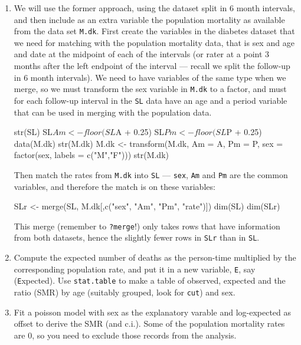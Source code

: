 \begin{enumerate}[resume]
\item We will use the former approach, using the dataset split in
  6 month intervals, and then include as an extra variable the
  population mortality as available from the data set
  \texttt{M.dk}.
  First create the variables in the diabetes dataset that we need
  for matching with the population mortality data, that is sex and
  age and date at the midpoint of each of the intervals (or rater at a
  point 3 months after the left endpoint of the interval --- recall
  we split the follow-up in 6 month intervals).
  We need to have variables of the same type when we merge, so we must
  transform the sex variable in \texttt{M.dk} to a factor, and must
  for each follow-up interval in the \texttt{SL} data have an age and
  a period variable that can be used in merging with the population data.
\begin{Schunk}
\begin{Sinput}
 str(SL)
 SL$Am <- floor(SL$A + 0.25)
 SL$Pm <- floor(SL$P + 0.25)
 data(M.dk)
 str(M.dk)
 M.dk <- transform(M.dk, Am = A,
                         Pm = P,
                        sex = factor(sex, labels = c("M","F")))
 str(M.dk)
\end{Sinput}
\end{Schunk}
Then match the rates from \texttt{M.dk} into \texttt{SL} ---
\texttt{sex}, \texttt{Am} and \texttt{Pm} are the common variables,
and therefore the match is on these variables:
\begin{Schunk}
\begin{Sinput}
 SLr <- merge(SL, M.dk[,c("sex", "Am", "Pm", "rate")])
 dim(SL)
 dim(SLr)
\end{Sinput}
\end{Schunk}
This merge (remember to \texttt{?merge}!) only takes rows that have
information from both datasets, hence the slightly fewer rows in
\texttt{SLr} than in \texttt{SL}.
\item Compute the expected number of deaths as the person-time
   multiplied by the corresponding population rate, and put it in a
   new variable, \texttt{E}, say (\texttt{E}xpected). Use \texttt{stat.table}
   to make a table of observed, expected and the ratio (SMR) by age
   (suitably grouped, look for \texttt{cut}) and sex.
\item Fit a poisson model with sex as the explanatory varable and
  log-expected as offset to derive the SMR (and c.i.).
  Some of the population mortality rates are 0, so you need to exclude
  those records from the analysis.

\end{enumerate}
